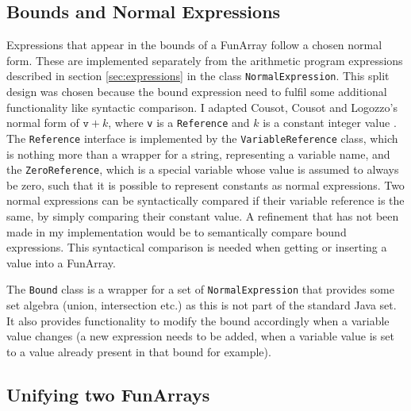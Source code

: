 \documentclass{report}
\begin{document}
\subsection{Bounds and Normal Expressions}

Expressions that appear in the bounds of a FunArray follow a chosen normal form. These are implemented separately from the arithmetic program expressions described in section \ref{sec:expressions} in the class \texttt{NormalExpression}. This split design was chosen because the bound expression need to fulfil some additional functionality like syntactic comparison. I adapted Cousot, Cousot and Logozzo's normal form of $\mathtt{v}+k$, where \texttt{v} is a \texttt{Reference} and $k$ is a constant integer value \cite{cousot2011}. The \texttt{Reference} interface is implemented by the \texttt{VariableReference} class, which is nothing more than a wrapper for a string, representing a variable name, and the \texttt{ZeroReference}, which is a special variable whose value is assumed to always be zero, such that it is possible to represent constants as normal expressions. Two normal expressions can be syntactically compared if their variable reference is the same, by simply comparing their constant value. A refinement that has not been made in my implementation would be to semantically compare bound expressions. This syntactical comparison is needed when getting or inserting a value into a FunArray.

The \texttt{Bound} class is a wrapper for a set of \texttt{NormalExpression} that provides some set algebra (union, intersection etc.) as this is not part of the standard Java set. It also provides functionality to modify the bound accordingly when a variable value changes (a new expression needs to be added, when a variable value is set to a value already present in that bound for example).

\subsection{Unifying two FunArrays}\label{sec:funarray:unifying}
\end{document}
